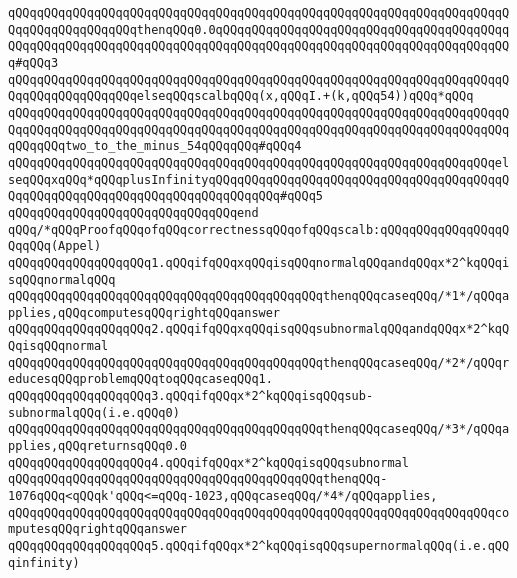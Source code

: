 \verb|qQQqqQQqqQQqqQQqqQQqqQQqqQQqqQQqqQQqqQQqqQQqqQQqqQQqqQQqqQQqqQQqqQQqqQQqqQQqqQQqqQQqqQQqthenqQQq0.0qQQqqQQqqQQqqQQqqQQqqQQqqQQqqQQqqQQqqQQqqQQqqQQqqQQqqQQqqQQqqQQqqQQqqQQqqQQqqQQqqQQqqQQqqQQqqQQqqQQqqQQqqQQqqQQq#qQQq3|\newline
\verb|qQQqqQQqqQQqqQQqqQQqqQQqqQQqqQQqqQQqqQQqqQQqqQQqqQQqqQQqqQQqqQQqqQQqqQQqqQQqqQQqqQQqqQQqelseqQQqscalbqQQq(x,qQQqI.+(k,qQQq54))qQQq*qQQq|\newline
\verb|qQQqqQQqqQQqqQQqqQQqqQQqqQQqqQQqqQQqqQQqqQQqqQQqqQQqqQQqqQQqqQQqqQQqqQQqqQQqqQQqqQQqqQQqqQQqqQQqqQQqqQQqqQQqqQQqqQQqqQQqqQQqqQQqqQQqqQQqqQQqqQQqqQQqtwo_to_the_minus_54qQQqqQQq#qQQq4|\newline
\verb|qQQqqQQqqQQqqQQqqQQqqQQqqQQqqQQqqQQqqQQqqQQqqQQqqQQqqQQqqQQqqQQqqQQqelseqQQqxqQQq*qQQqplusInfinityqQQqqQQqqQQqqQQqqQQqqQQqqQQqqQQqqQQqqQQqqQQqqQQqqQQqqQQqqQQqqQQqqQQqqQQqqQQqqQQq#qQQq5|\newline
\verb|qQQqqQQqqQQqqQQqqQQqqQQqqQQqqQQqend|\newline
\verb|qQQq/*qQQqProofqQQqofqQQqcorrectnessqQQqofqQQqscalb:qQQqqQQqqQQqqQQqqQQqqQQq(Appel)|\newline
\verb|qQQqqQQqqQQqqQQqqQQq1.qQQqifqQQqxqQQqisqQQqnormalqQQqandqQQqx*2^kqQQqisqQQqnormalqQQq|\newline
\verb|qQQqqQQqqQQqqQQqqQQqqQQqqQQqqQQqqQQqqQQqqQQqthenqQQqcaseqQQq/*1*/qQQqapplies,qQQqcomputesqQQqrightqQQqanswer|\newline
\verb|qQQqqQQqqQQqqQQqqQQq2.qQQqifqQQqxqQQqisqQQqsubnormalqQQqandqQQqx*2^kqQQqisqQQqnormal|\newline
\verb|qQQqqQQqqQQqqQQqqQQqqQQqqQQqqQQqqQQqqQQqqQQqthenqQQqcaseqQQq/*2*/qQQqreducesqQQqproblemqQQqtoqQQqcaseqQQq1.|\newline
\verb|qQQqqQQqqQQqqQQqqQQq3.qQQqifqQQqx*2^kqQQqisqQQqsub-subnormalqQQq(i.e.qQQq0)|\newline
\verb|qQQqqQQqqQQqqQQqqQQqqQQqqQQqqQQqqQQqqQQqqQQqthenqQQqcaseqQQq/*3*/qQQqapplies,qQQqreturnsqQQq0.0|\newline
\verb|qQQqqQQqqQQqqQQqqQQq4.qQQqifqQQqx*2^kqQQqisqQQqsubnormal|\newline
\verb|qQQqqQQqqQQqqQQqqQQqqQQqqQQqqQQqqQQqqQQqqQQqthenqQQq-1076qQQq<qQQqk'qQQq<=qQQq-1023,qQQqcaseqQQq/*4*/qQQqapplies,|\newline
\verb|qQQqqQQqqQQqqQQqqQQqqQQqqQQqqQQqqQQqqQQqqQQqqQQqqQQqqQQqqQQqqQQqqQQqcomputesqQQqrightqQQqanswer|\newline
\verb|qQQqqQQqqQQqqQQqqQQq5.qQQqifqQQqx*2^kqQQqisqQQqsupernormalqQQq(i.e.qQQqinfinity)|\newline
